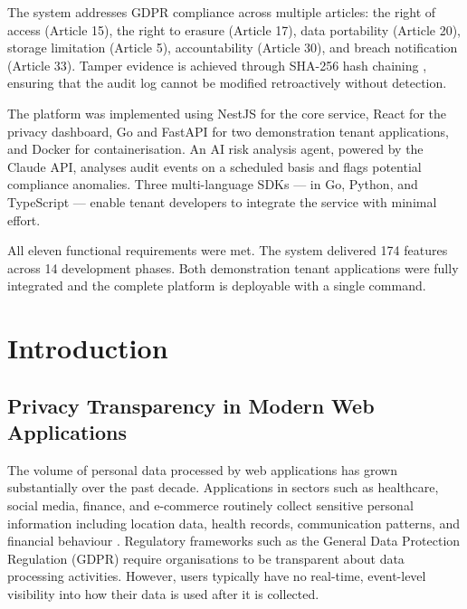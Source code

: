 \documentclass[a4paper,12pt,onecolumn]{report}
\begin{document}
The system addresses GDPR compliance across multiple articles: the right of access (Article 15), the right to erasure (Article 17), data portability (Article 20), storage limitation (Article 5), accountability (Article 30), and breach notification (Article 33).
Tamper evidence is achieved through SHA-256 hash chaining \cite{hashchain}, ensuring that the audit log cannot be modified retroactively without detection.

The platform was implemented using NestJS for the core service, React for the privacy dashboard, Go and FastAPI for two demonstration tenant applications, and Docker for containerisation.
An AI risk analysis agent, powered by the Claude API, analyses audit events on a scheduled basis and flags potential compliance anomalies.
Three multi-language SDKs --- in Go, Python, and TypeScript --- enable tenant developers to integrate the service with minimal effort.

All eleven functional requirements were met.
The system delivered 174 features across 14 development phases.
Both demonstration tenant applications were fully integrated and the complete platform is deployable with a single command.

\newpage


\chapter{Introduction}

\section{Privacy Transparency in Modern Web Applications}

The volume of personal data processed by web applications has grown substantially over the past decade.
Applications in sectors such as healthcare, social media, finance, and e-commerce routinely collect sensitive personal information including location data, health records, communication patterns, and financial behaviour \cite{gdpr2016}.
Regulatory frameworks such as the General Data Protection Regulation (GDPR) \cite{gdpr2016} require organisations to be transparent about data processing activities.
However, users typically have no real-time, event-level visibility into how their data is used after it is collected.
\end{document}
